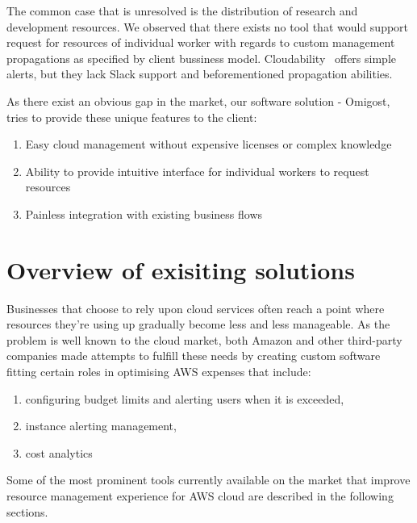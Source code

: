 \documentclass[licencjacka,en]{thesisclass}
\begin{document}
        The common case that is unresolved is the distribution of research and development resources.
        We observed that there exists no tool that would support request for resources of individual worker with regards to custom management propagations as specified by client bussiness model.
        Cloudability~\cite{CloudabilityAlerts} offers simple alerts, but they lack Slack support and beforementioned propagation abilities.

        As there exist an obvious gap in the market, our software solution - Omigost, tries to provide these unique features to the client:

        \begin{enumerate}
            \item Easy cloud management without expensive licenses or complex knowledge
            \item Ability to provide intuitive interface for individual workers to request resources
            \item Painless integration with existing business flows
        \end{enumerate}

    \section{Overview of exisiting solutions}
    
        Businesses that choose to rely upon cloud services often reach a point where resources
	they’re using up gradually become less and less manageable. As the problem is well known
	to the cloud market, both Amazon and other third-party companies made attempts to fulfill
these needs by creating custom software fitting certain roles in optimising AWS expenses that include:        

        \begin{enumerate}
		\item configuring budget limits and alerting users when it is exceeded,
		\item instance alerting management,
		\item cost analytics
        \end{enumerate}

        Some of the most prominent tools currently available on the market that improve resource management experience for AWS cloud are described in the following sections.
        
\end{document}
